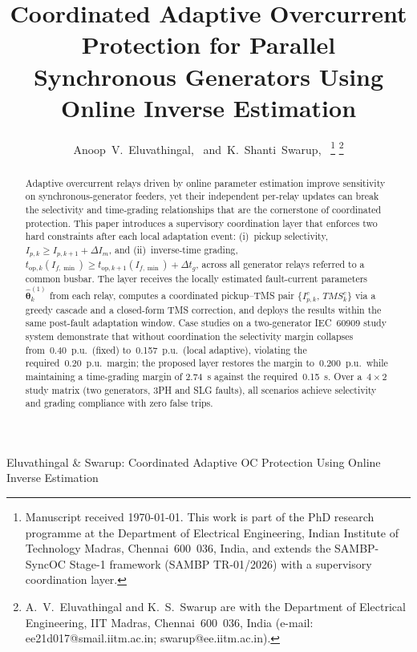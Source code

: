 \documentclass[journal,twoside,letterpaper]{IEEEtran}
\newcommand{\vect}[1]{\bm{#1}}
\newcommand{\est}[1]{\hat{#1}}
\begin{document}
\title{Coordinated Adaptive Overcurrent Protection for Parallel
       Synchronous Generators Using Online Inverse Estimation}

\author{Anoop~V.~Eluvathingal,~
        and~K.~Shanti~Swarup,~%
\thanks{Manuscript received \today.
        This work is part of the PhD research programme at the Department of
        Electrical Engineering, Indian Institute of Technology Madras,
        Chennai~600~036, India, and extends the SAMBP-SyncOC Stage-1
        framework (SAMBP TR-01/2026) with a supervisory coordination layer.}%
\thanks{A.~V.~Eluvathingal and K.~S.~Swarup are with the Department of
        Electrical Engineering, IIT Madras, Chennai~600~036, India
        (e-mail: ee21d017@smail.iitm.ac.in; swarup@ee.iitm.ac.in).}}

%
{Eluvathingal \& Swarup: Coordinated Adaptive OC Protection Using Online
Inverse Estimation}

\maketitle

\begin{abstract}
Adaptive overcurrent relays driven by online parameter
estimation improve sensitivity on synchronous-generator feeders,
yet their independent per-relay updates can break the
selectivity and time-grading relationships that are the
cornerstone of coordinated protection.
This paper introduces a supervisory coordination layer that
enforces two hard constraints after each local adaptation event:
(i)~pickup selectivity,
$I_{p,k} \geq I_{p,k+1} + \Delta I_m$, and
(ii)~inverse-time grading,
$t_{\mathrm{op},k}(I_{f,\min}) \geq
 t_{\mathrm{op},k+1}(I_{f,\min}) + \Delta t_g$,
across all generator relays referred to a common busbar.
The layer receives the locally estimated fault-current
parameters~$\est{\vect\theta}_k^{(1)}$ from each relay,
computes a coordinated pickup--TMS pair
$\{I_{p,k}^c,\,TMS_k^c\}$
via a greedy cascade and a closed-form TMS correction,
and deploys the results within the same post-fault
adaptation window.
Case studies on a two-generator IEC~60909 study system
demonstrate that without coordination the selectivity
margin collapses from~0.40~p.u.\ (fixed) to~0.157~p.u.\
(local adaptive), violating the required~0.20~p.u.\ margin;
the proposed layer restores the margin to~0.200~p.u.\
while maintaining a time-grading margin of 2.74~s against the
required~0.15~s.
Over a~$4 \times 2$ study matrix (two generators, 3PH and SLG
faults), all scenarios achieve selectivity and grading
compliance with zero false trips.
\end{abstract}
\end{document}
